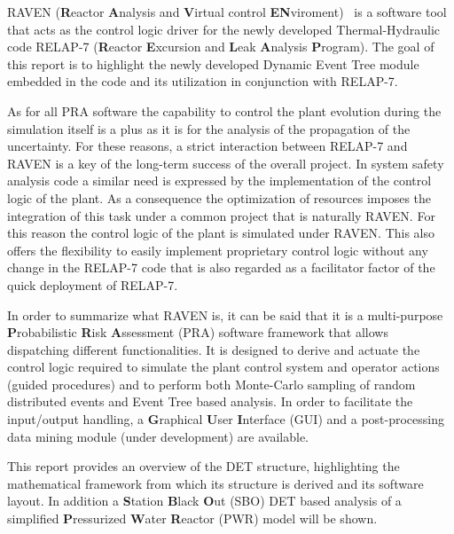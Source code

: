 \label{sec:introduction}
RAVEN (\textbf{R}eactor \textbf{A}nalysis and \textbf{V}irtual control \textbf{EN}viroment)~\cite{ravenFY12,mandelliANS2012} is a software tool that acts as the control logic driver for the newly developed Thermal-Hydraulic code RELAP-7  (\textbf{R}eactor \textbf{E}xcursion and \textbf{L}eak \textbf{A}nalysis \textbf{P}rogram). The goal of this report is to highlight the newly developed  Dynamic Event Tree module embedded in the code and its utilization in conjunction with RELAP-7. 

As for all PRA software the capability to control the plant evolution during the simulation itself is a plus as it is for the analysis of the propagation of the uncertainty. For these reasons, a strict interaction between RELAP-7 and RAVEN is a key of the long-term success of the overall project. In system safety analysis code a similar need is expressed by the implementation of the control logic of the plant. As a consequence the optimization of resources imposes the integration of this task under a common project that is naturally RAVEN. For this reason the control logic of the plant is simulated under RAVEN. This also offers the flexibility to easily implement proprietary control logic  without any change in the RELAP-7 code that is also regarded as a facilitator factor of the quick deployment of RELAP-7.

In order to summarize what RAVEN is, it can be said that it is a multi-purpose \textbf{P}robabilistic \textbf{R}isk \textbf{A}ssessment (PRA) software framework that allows dispatching different functionalities. 
It is designed to derive and actuate the control logic required to simulate the plant control system and operator actions (guided procedures) and to perform both Monte-Carlo sampling of random distributed events and Event Tree based analysis. 
In order to facilitate the input/output handling, a \textbf{G}raphical \textbf{U}ser \textbf{I}nterface (GUI) and a post-processing data mining module (under development) are available.

This report provides an overview of the DET structure, highlighting the mathematical framework from which its structure is derived and its software layout. In addition a \textbf{S}tation \textbf{B}lack \textbf{O}ut (SBO) DET based analysis of a simplified \textbf{P}ressurized \textbf{W}ater \textbf{R}eactor (PWR) model will be shown.
\vspace{-5mm}



